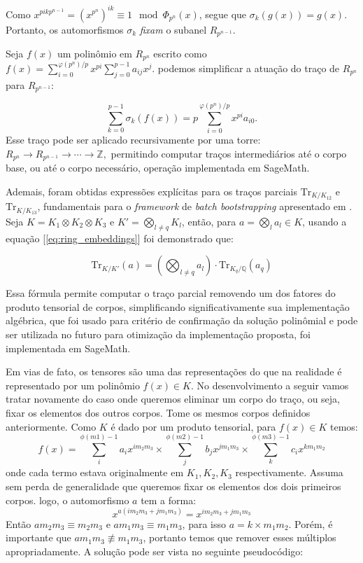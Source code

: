Como $x^{p i k p^{n-1}} = (x^{p^n})^{ik} \equiv 1 \mod \Phi_{p^n}(x)$, segue que $\sigma_k(g(x)) = g(x)$. Portanto, os automorfismos $\sigma_k$ \emph{fixam} o subanel $R_{p^{n-1}}$.

Seja $f(x)$ um polinômio em $R_{p^n}$ escrito como 
$
f(x) = \sum_{i=0}^{\varphi(p^n)/p} x^{pi} \sum_{j=0}^{p-1} a_{ij} x^j.
$ podemos simplificar a atuação do traço de $R_{p^n}$ para $R_{p^{n-1}}$:

\[
\sum_{k=0}^{p-1} \sigma_k(f(x)) = p \sum_{i=0}^{\varphi(p^n)/p} x^{pi} a_{i0}.
\]
Esse traço pode ser aplicado recursivamente por uma torre:
$
R_{p^n} \longrightarrow R_{p^{n-1}} \longrightarrow \cdots \longrightarrow \mathbb{Z},
$
permitindo computar traços intermediários até o corpo base, ou até o corpo necessário, operação implementada em SageMath.

Ademais, foram obtidas expressões explícitas para os traços parciais $\mathrm{Tr}_{K/K_{12}}$ e $\mathrm{Tr}_{K/K_{13}}$, fundamentais para o \textit{framework} de \textit{batch bootstrapping} apresentado em \cite{lw23I}. Seja $K = K_1 \otimes K_2 \otimes K_3$ e $K' = \bigotimes_{l \neq q} K_l$, então, para $a = \bigotimes_l a_l \in K$, usando a equação [\ref{eq:ring_embeddings}] foi demonstrado que:

\begin{equation}
    \mathrm{Tr}_{K/K'} (a) = \left( \bigotimes_{l \neq q} a_l \right) \cdot \mathrm{Tr}_{K_q/\mathbb{Q}} (a_q)
\end{equation}

Essa fórmula permite computar o traço parcial removendo um dos fatores do produto tensorial de corpos, simplificando significativamente sua implementação algébrica, que foi usado para critério de confirmação da solução polinômial e pode ser utilizada no futuro para otimização da implementação proposta, foi implementada em SageMath.

Em vias de fato, os tensores são uma das representações do que 
na realidade é representado por um polinômio $f(x) \in K$. No desenvolvimento a seguir vamos tratar novamente do caso onde queremos eliminar um corpo do traço, ou seja,
fixar os elementos dos outros corpos. Tome os mesmos corpos definidos anteriormente. Como $K$ é dado por um produto tensorial, para $f(x) \in K$ temos:  
$$
f(x) = \sum_i^{\phi(m1)-1} a_i x^{im_2m_3} \times \sum_j^{\phi(m2)-1} b_j x^{jm_1m_3} \times \sum_k^{\phi(m3)-1} c_i x^{km_1m_2}
$$ 
onde cada termo estava originalmente em $K_1,K_2, K_3$ respectivamente. Assuma sem perda de generalidade que queremos fixar os elementos dos dois primeiros corpos.
logo, o automorfismo $a$ tem a forma: 
$$
 x^{a(im_2m_3 + jm_1m_3)} = x^{im_2m_3 + jm_1m_3}
$$
Então $a m_2 m_3 \equiv m_2 m_3 $ e $a m_1 m_3 \equiv m_1 m_3$, para isso $a = k \times m_1 m_2$. Porém, é importante que $a m_1 m_3 \not\equiv m_1 m_3$, portanto
temos que remover esses múltiplos apropriadamente. A solução pode ser vista no seguinte pseudocódigo:

